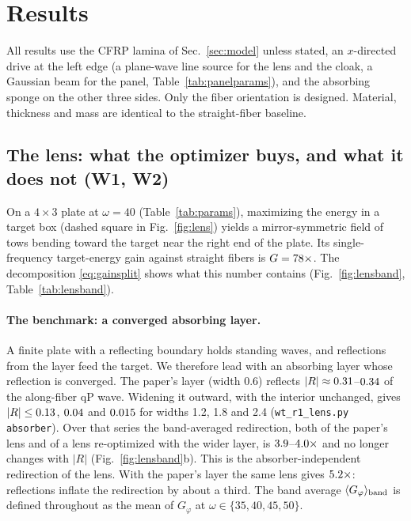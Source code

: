 \section{Results}\label{sec:results}
All results use the CFRP lamina of Sec.~\ref{sec:model} unless stated, an $x$-directed drive at the
left edge (a plane-wave line source for the lens and the cloak, a Gaussian beam for the panel,
Table~\ref{tab:panelparams}), and the absorbing sponge on the other three sides. Only the fiber
orientation is designed. Material, thickness and mass are identical to the straight-fiber baseline.

\subsection{The lens: what the optimizer buys, and what it does not (W1, W2)}\label{sec:lens}
On a $4\times3$ plate at $\omega=40$ (Table~\ref{tab:params}), maximizing the energy in a target box
(dashed square in Fig.~\ref{fig:lens}) yields a mirror-symmetric field of tows bending toward the target
near the right end of the plate. Its single-frequency target-energy gain against straight fibers is
$G=78\times$. The decomposition \eqref{eq:gainsplit} shows what this number contains
(Fig.~\ref{fig:lensband}, Table~\ref{tab:lensband}).

\paragraph{The benchmark: a converged absorbing layer.} A finite plate with a reflecting boundary holds
standing waves, and reflections from the layer feed the target. We therefore lead with an absorbing
layer whose reflection is converged. The paper's layer (width 0.6) reflects $|R|\approx0.31$--$0.34$
of the along-fiber qP wave. Widening it outward, with the interior unchanged, gives $|R|\le0.13$,
$0.04$ and $0.015$ for widths 1.2, 1.8 and 2.4 (\texttt{wt\_r1\_lens.py absorber}). Over that
series the band-averaged redirection, both of the paper's lens and of a lens re-optimized with the
wider layer, is $3.9$--$4.0\times$ and no longer changes with $|R|$
(Fig.~\ref{fig:lensband}b). This is the absorber-independent redirection of the lens. With the paper's
layer the same lens gives $5.2\times$: reflections inflate the redirection by about a third.
The band average $\langle G_\varphi\rangle_{\rm band}$ is defined throughout as the mean of $G_\varphi$ at
$\omega\in\{35,40,45,50\}$.


